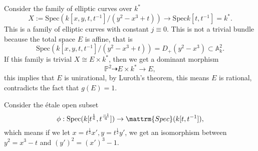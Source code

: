 \documentclass[main.tex]{subfiles}
\begin{document}
\begin{example}
Consider the family of elliptic curves over $k^{*}$
$$X:=\mathrm{Spec}(k[x,y, t,t^{-1}]/(y^{2}-x^{3}+t))\rightarrow \mathrm{Spec}k[t,t^{-1}]=k^{*}.$$
This is a family of elliptic curves with constant $j\equiv 0$. This is not a trivial bundle because the total space $E$ is affine, that is 
$$\mathrm{Spec}(k[x,y, t,t^{-1}]/(y^{2}-x^{3}+t))=D_{+}(y^{2}-x^{3})\subset \mathbb{A}_{k}^{2}.$$
If this family is trivial $X\cong E\times k^{*}$, then we get a dominant morphism 
$$\mathbb{P}^{2}\dashrightarrow E\times k^{*}\rightarrow E,$$
this implies that $E$ is unirational, by Luroth's theorem, this means $E$ is rational, contradicts the fact that $g(E)=1$.
\end{example}
\begin{remark}
Consider the étale open subset 
$$\phi:\mathrm{Spec}(k[t^{\frac{1}{6}}, t^{\frac{-1}{6}}])\rightarrow \mattrm{Spec}(k[t,t^{-1}]),$$
which means if we let $x=t^{\frac{1}{3}}x', y=t^{\frac{1}{2}}y'$, we get an isomorphism between $y^{2}=x^{3}-t$ and $(y')^{2}=(x')^{3}-1.$
\end{remark}
\end{document}
